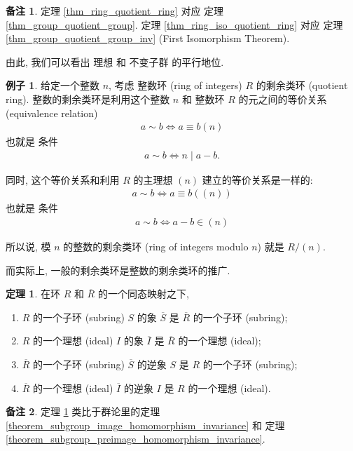 \documentclass[utf8]{ctexbook}
\theoremstyle{definition}
\newtheorem{prototheorem}{定理}[section]
\newenvironment{theorem}
   {\colorlet{shadecolor}{red!30}\begin{shaded}\begin{prototheorem}}
   {\end{prototheorem}\end{shaded}}
\newtheorem{memo}{备注}[section]
\newtheorem{example}{例子}[section]
\begin{document}
\begin{memo}
定理 \ref{thm_ring_quotient_ring} 对应 定理 \ref{thm_group_quotient_group}. 定理 \ref{thm_ring_iso_quotient_ring} 对应 定理 \ref{thm_group_quotient_group_inv} (First Isomorphism Theorem).

由此, 我们可以看出 理想 和 不变子群 的平行地位.
\end{memo}

\begin{example}
给定一个整数 $n$, 考虑 整数环 (ring of integers) $R$ 的剩余类环 (quotient ring). 整数的剩余类环是利用这个整数 $n$ 和 整数环 $R$ 的元之间的等价关系 (equivalence relation)
\begin{align*}
a \sim b \iff a \equiv b (n)
\end{align*}
也就是 条件
\begin{align*}
a \sim b \iff n \mid a - b .
\end{align*}


同时, 这个等价关系和利用 $R$ 的主理想 $(n)$ 建立的等价关系是一样的:
\begin{align*}
a \sim b \iff a \equiv b ( (n) )
\end{align*}
也就是 条件 
\begin{align*}
a \sim b \iff a - b \in (n) 
\end{align*}

所以说, 模 $n$ 的整数的剩余类环 (ring of integers modulo $n$) 就是 $R/(n)$.

而实际上, 一般的剩余类环是整数的剩余类环的推广.

\end{example}

\begin{theorem}\label{theorem_subring_image_preimage_homomorphism_invariance}
在环 $R$ 和 $\overline{R}$ 的一个同态映射之下,
\begin{enumerate}
\item{$R$ 的一个子环 (subring) $S$ 的象 $\overline{S}$ 是 $\overline{R}$ 的一个子环 (subring); }
\item{$R$ 的一个理想 (ideal) $I$ 的象 $\overline{I}$ 是 $\overline{R}$ 的一个理想 (ideal);}
\item{$\overline{R}$ 的一个子环 (subring) $\overline{S}$ 的逆象 $S$ 是 $R$ 的一个子环 (subring); }
\item{$\overline{R}$ 的一个理想 (ideal) $\overline{I}$ 的逆象 $I$ 是 $R$ 的一个理想 (ideal). }
\end{enumerate}
\end{theorem}

\begin{memo}
定理 \ref{theorem_subring_image_preimage_homomorphism_invariance} 类比于群论里的定理 \ref{theorem_subgroup_image_homomorphism_invariance} 和 定理 \ref{theorem_subgroup_preimage_homomorphism_invariance}.
\end{memo}
\end{document}
